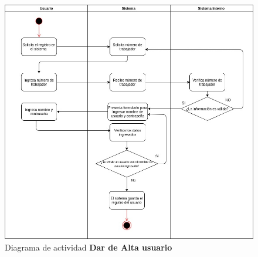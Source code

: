 \pagebreak
\begin{figure}[h]
\centering
\caption{Diagrama de actividad \textbf{Dar de Alta usuario}}
\label{fig:priorReq}
\includegraphics[width=1.2\textwidth, height=1.5\textwidth]{images/diag_act_alta_usuario}
\end{figure}

